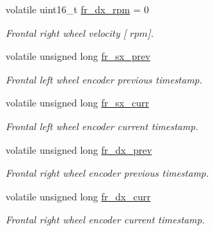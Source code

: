 \begin{DoxyCompactItemize}
volatile uint16\+\_\+t \mbox{\hyperlink{group___board__model__group_ga7ef4b53bcdb3160d25627fcf012408ea}{fr\+\_\+dx\+\_\+rpm}} = 0
\begin{DoxyCompactList}\small\item\em Frontal right wheel velocity \mbox{[} $rpm$\mbox{]}. \end{DoxyCompactList}\item 
\mbox{\label{group___board__model__group_ga908422e0b6bd109d89c0bc0fc857cc99}} 
volatile unsigned long \mbox{\hyperlink{group___board__model__group_ga908422e0b6bd109d89c0bc0fc857cc99}{fr\+\_\+sx\+\_\+prev}}
\begin{DoxyCompactList}\small\item\em Frontal left wheel encoder previous timestamp. \end{DoxyCompactList}\item 
\mbox{\label{group___board__model__group_ga175cffcd8d91b98bb52c76fd892c7edd}} 
volatile unsigned long \mbox{\hyperlink{group___board__model__group_ga175cffcd8d91b98bb52c76fd892c7edd}{fr\+\_\+sx\+\_\+curr}}
\begin{DoxyCompactList}\small\item\em Frontal left wheel encoder current timestamp. \end{DoxyCompactList}\item 
\mbox{\label{group___board__model__group_ga0e39646ad4505ba7272e9b4b4c984c46}} 
volatile unsigned long \mbox{\hyperlink{group___board__model__group_ga0e39646ad4505ba7272e9b4b4c984c46}{fr\+\_\+dx\+\_\+prev}}
\begin{DoxyCompactList}\small\item\em Frontal right wheel encoder previous timestamp. \end{DoxyCompactList}\item 
\mbox{\label{group___board__model__group_gaa36d66b7949255c16db3f417c4ecf4cf}} 
volatile unsigned long \mbox{\hyperlink{group___board__model__group_gaa36d66b7949255c16db3f417c4ecf4cf}{fr\+\_\+dx\+\_\+curr}}
\begin{DoxyCompactList}\small\item\em Frontal right wheel encoder current timestamp. \end{DoxyCompactList}\item 

\end{DoxyCompactItemize}
